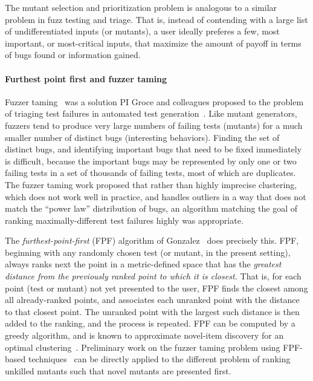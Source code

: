 The mutant selection and prioritization problem is analogous to a similar
problem in fuzz testing and triage.  That is, instead of contending with a large
list of undifferentiated inputs (or mutants), a user ideally preferes a few,
most important, or most-critical inputs, that maximize the amount of payoff in
terms of bugs found or information gained.

\paragraph{Furthest point first and fuzzer taming} Fuzzer taming~\cite{PLDI13}
was a solution PI Groce and colleagues proposed to the problem 
of triaging test failures in automated test generation~\cite{SemCrash}.  
Like mutant generators, fuzzers tend to produce very large numbers of failing
tests (mutants) for a much
smaller number of distinct bugs (interesting behaviors).  Finding the set of distinct bugs,
and identifying important bugs that need to be fixed immediately is
difficult, because the important bugs may be represented by only one
or two failing tests in a set of thousands of failing tests, most of
which are duplicates.  The fuzzer taming work proposed that rather than highly imprecise
clustering, which does not work well in practice, and handles outliers
in a way that does not match the ``power law'' distribution of bugs, an
algorithm matching the goal of ranking maximally-different test
failures highly was appropriate. 

The \emph{furthest-point-first} (FPF) algorithm of
Gonzalez~\cite{Gonzalez85} does precisely this.  FPF, beginning with
any randomly chosen test (or mutant, in the present setting), always ranks
next the point in a metric-defined space that has the \emph{greatest
  distance from the previously ranked point to which it is closest.}
That is, for each point (test or mutant) not yet presented to the
user, FPF finds the closest among all already-ranked points, and
associates each unranked point with the distance to that closest
point.  The unranked point with the largest such distance is then
added to the ranking, and the process is repeated.  FPF can be
computed by a greedy algorithm, and is known to approximate novel-item
discovery for an optimal clustering~\cite{Gonzalez85}.  Preliminary work on the fuzzer taming problem using FPF-based
techniques~\cite{PLDI13,distMut} can be directly applied
to the different problem of ranking
unkilled mutants such that novel mutants are presented first.  %

